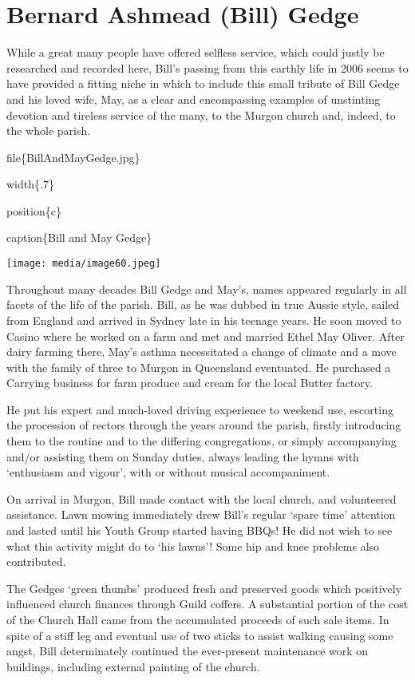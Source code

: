 \hypertarget{bernard-ashmead-bill-gedge}{%
\section{Bernard Ashmead (Bill) Gedge}\label{bernard-ashmead-bill-gedge}}

While a great many people have offered selfless service, which could justly be researched and recorded here, Bill's passing from this earthly life in 2006 seems to have provided a fitting niche in which to include this small tribute of Bill Gedge and his loved wife, May, as a clear and encompassing examples of unstinting devotion and tireless service of the many, to the Murgon church and, indeed, to the whole parish.

file\{BillAndMayGedge.jpg\}

width\{.7\}

position\{c\}

caption\{Bill and May Gedge\}

\texttt{[image: media/image60.jpeg]}

Throughout many decades Bill Gedge and May's, names appeared regularly in all facets of the life of the parish. Bill, as he was dubbed in true Aussie style, sailed from England and arrived in Sydney late in his teenage years. He soon moved to Casino where he worked on a farm and met and married Ethel May Oliver. After dairy farming there, May's asthma necessitated a change of climate and a move with the family of three to Murgon in Queensland eventuated. He purchased a Carrying business for farm produce and cream for the local Butter factory.

He put his expert and much-loved driving experience to weekend use, escorting the procession of rectors through the years around the parish, firstly introducing them to the routine and to the differing congregations, or simply accompanying and/or assisting them on Sunday duties, always leading the hymns with `enthusiasm and vigour', with or without musical accompaniment.

On arrival in Murgon, Bill made contact with the local church, and volunteered assistance. Lawn mowing immediately drew Bill's regular `spare time' attention and lasted until his Youth Group started having BBQs! He did not wish to see what this activity might do to `his lawns'! Some hip and knee problems also contributed.

The Gedges `green thumbs' produced fresh and preserved goods which positively influenced church finances through Guild coffers. A substantial portion of the cost of the Church Hall came from the accumulated proceeds of such sale items. In spite of a stiff leg and eventual use of two sticks to assist walking causing some angst, Bill determinately continued the ever-present maintenance work on buildings, including external painting of the church.

